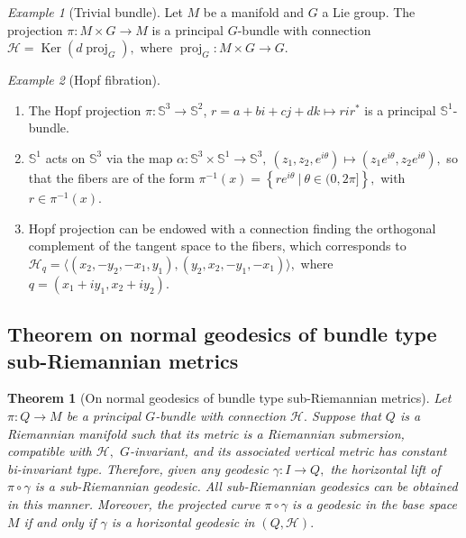 \documentclass [xcolor=svgnames, t] {beamer}
\theoremstyle{definition}
\theoremstyle{plain}
\newtheorem{thm}{Theorem}
\theoremstyle{remark}
\newtheorem{ex}{Example}
\begin{document}
\begin{frame}
\begin{ex}[Trivial bundle]
	Let $ M $ be a manifold and $ G $ a Lie group. The projection $ \pi: M \times G \rightarrow M $ is a principal $ G $-bundle with connection $ \mathcal{H}= \operatorname{Ker}(  d \operatorname{proj}_G), $ 	where $ \operatorname{proj}_G : M\times G \rightarrow G. $ 
\end{ex}
\begin{ex}[Hopf fibration]
	\begin{enumerate}
		\item The Hopf projection $ \pi: \mathbb{S}^3 \rightarrow \mathbb{S}^2 $, $ r=a+bi+cj+dk \mapsto rir^* $  is a principal $ \mathbb{S}^1  $-bundle. 
		\item $ \mathbb{S}^1 $ acts on $ \mathbb{S}^3 $ via the map $ \alpha: \mathbb{S}^3\times \mathbb{S}^1 \rightarrow \mathbb{S}^3, \ (z_1,z_2,e^{i\theta}) \mapsto (z_1e^{i\theta},z_2e^{i\theta}), $ so that the fibers are of the form $ \pi^{-1}(x)= \left\{ re^{i\theta}\ |\ \theta\in(0,2\pi] \right\},  $ with $ r\in \pi^{-1}(x). $
		\item Hopf projection can be endowed with a connection finding the orthogonal complement of the tangent space to the fibers, which corresponds to $ \mathcal{H}_{q} = \langle(x_2,-y_2,-x_1,y_1),(y_2,x_2,-y_1,-x_1)\rangle,  $ where  	$ q=(x_1+iy_1, x_2+iy_2). $   
	\end{enumerate}
\end{ex}
\end{frame}
\subsection{Theorem on normal geodesics of bundle type sub-Riemannian metrics}%
\label{sub:theorem_on_normal_geodesics_of_bundle_type_sub_riemannian_metrics}
\begin{frame}
\begin{thm}[On normal geodesics of bundle type sub-Riemannian metrics]\label{thm:normal_geodesics}
	Let $ \pi: Q \rightarrow M $ be a principal $ G $-bundle with connection $ \mathcal{H}. $ Suppose that $ Q $ is a Riemannian manifold such that its metric is a Riemannian submersion, compatible with $ \mathcal{H}, $ $ G $-invariant, and its associated vertical metric has constant bi-invariant type. Therefore, given any geodesic $\gamma: I \rightarrow Q, $ the horizontal lift of $ \pi\circ\gamma $ is a sub-Riemannian geodesic. All sub-Riemannian geodesics can be obtained in this manner. Moreover, the projected curve $ \pi\circ\gamma$ is a geodesic in the base space $ M $ if and only if $ \gamma $ is a horizontal geodesic in $ (Q, \mathcal{H}). $ 
\end{thm}
\end{frame}
\end{document}
